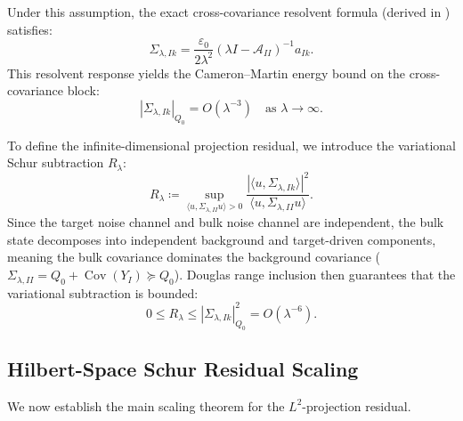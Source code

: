 \documentclass[11pt]{amsart}
\theoremstyle{plain}
\theoremstyle{definition}
\theoremstyle{remark}
\begin{document}
Under this assumption, the exact cross-covariance resolvent formula (derived in ) satisfies:
\begin{equation}
  \Sigma_{\lambda,Ik} = \frac{\varepsilon_0}{2\lambda^2} (\lambda I - \mathcal{A}_{II})^{-1} a_{Ik}.
\end{equation}
This resolvent response yields the Cameron--Martin energy bound on the cross-covariance block:
\begin{equation}
  \label{eq:cross_energy_bound}
  |\Sigma_{\lambda,Ik}|_{Q_0} = O(\lambda^{-3}) \quad \text{as } \lambda \to \infty.
\end{equation}

To define the infinite-dimensional projection residual, we introduce the variational Schur subtraction $R_\lambda$:
\begin{equation}
  \label{eq:variational_schur_subtraction}
  R_\lambda \coloneqq \sup_{\langle u, \Sigma_{\lambda,II} u \rangle > 0} \frac{|\langle u, \Sigma_{\lambda,Ik} \rangle|^2}{\langle u, \Sigma_{\lambda,II} u \rangle}.
\end{equation}
Since the target noise channel and bulk noise channel are independent, the bulk state decomposes into independent background and target-driven components, meaning the bulk covariance dominates the background covariance ($\Sigma_{\lambda,II} = Q_0 + \operatorname{Cov}(Y_I) \succeq Q_0$). Douglas range inclusion then guarantees that the variational subtraction is bounded:
\begin{equation}
  0 \le R_\lambda \le |\Sigma_{\lambda,Ik}|_{Q_0}^2 = O(\lambda^{-6}).
\end{equation}

\subsection{Hilbert-Space Schur Residual Scaling}
\label{sec:infdim:scaling}

We now establish the main scaling theorem for the $L^2$-projection residual.
\end{document}
